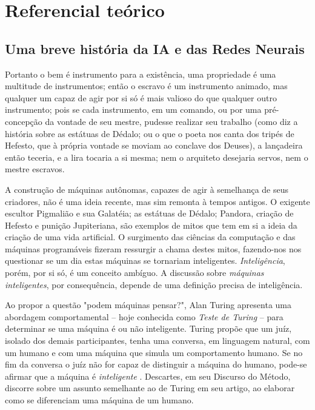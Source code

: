 \documentclass[12pt, a4paper]{article}
\begin{document}
\section{Referencial teórico}
\subsection{Uma breve história da IA e das Redes Neurais}
\begin{displayquote}
Portanto o bem é instrumento para a existência, uma propriedade é uma multitude de instrumentos; então o escravo é um instrumento animado,
mas qualquer um capaz de agir por si só é mais valioso do que qualquer outro instrumento; pois se cada instrumento, em um comando,
ou por uma pré-concepção da vontade de seu mestre, pudesse realizar seu trabalho (como diz a história sobre as estátuas de Dédalo; ou o que
o poeta nos canta dos tripés de Hefesto, que à própria vontade se moviam ao conclave dos Deuses), a lançadeira então teceria, e a lira
tocaria a si mesma; nem o arquiteto desejaria servos, nem o mestre escravos. \cite{aristotle_politics}
\end{displayquote}

A construção de máquinas autônomas, capazes de agir à semelhança de seus criadores, não é uma ideia recente, mas sim remonta à tempos antigos. 
O exigente escultor Pigmalião e sua Galatéia; as estátuas de Dédalo; Pandora, criação de Hefesto e punição Jupiteriana, 
são exemplos de mitos que tem em si a ideia da criação de uma vida artificial. 
O surgimento das ciências da computação e das máquinas programáveis fizeram ressurgir a chama destes mitos, 
fazendo-nos nos questionar se um dia estas máquinas se tornariam inteligentes. \emph{Inteligência}, porém, por si só, é um conceito ambíguo.
A discussão sobre \emph{máquinas inteligentes}, por consequência, depende de uma definição precisa de inteligência.

Ao propor a questão "podem máquinas pensar?", Alan Turing apresenta uma abordagem comportamental -- hoje conhecida como \emph{Teste de Turing} --
para determinar se uma máquina é ou não inteligente. Turing propõe que um juíz, isolado dos demais participantes,
tenha uma conversa, em linguagem natural, com um humano e com uma máquina que simula um comportamento humano.
Se no fim da conversa o juíz não for capaz de distinguir a máquina do humano, pode-se afirmar que a máquina é \emph{inteligente}
\cite{turing}. Descartes, em seu Discurso do Método, discorre sobre um assunto semelhante ao de Turing em seu artigo, ao elaborar como se diferenciam
uma máquina de um humano.
\end{document}
